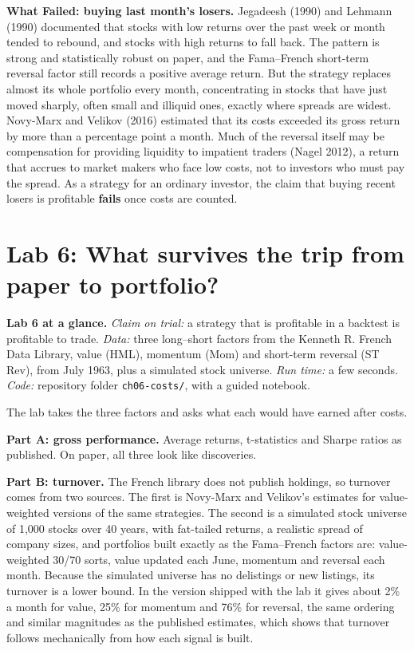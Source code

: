 \begin{callout}
\textbf{What Failed: buying last month's losers.} Jegadeesh (1990) and Lehmann (1990) documented that stocks with low returns over the past week or month tended to rebound, and stocks with high returns to fall back. The pattern is strong and statistically robust on paper, and the Fama--French short-term reversal factor still records a positive average return. But the strategy replaces almost its whole portfolio every month, concentrating in stocks that have just moved sharply, often small and illiquid ones, exactly where spreads are widest. Novy-Marx and Velikov (2016) estimated that its costs exceeded its gross return by more than a percentage point a month. Much of the reversal itself may be compensation for providing liquidity to impatient traders (Nagel 2012), a return that accrues to market makers who face low costs, not to investors who must pay the spread. As a strategy for an ordinary investor, the claim that buying recent losers is profitable \textbf{fails} once costs are counted.
\end{callout}

\section{Lab 6: What survives the trip from paper to portfolio?}
\label{sec:06-lab}

\begin{callout}
\textbf{Lab 6 at a glance.} \emph{Claim on trial:} a strategy that is profitable in a backtest is profitable to trade. \emph{Data:} three long--short factors from the Kenneth R. French Data Library, value (HML), momentum (Mom) and short-term reversal (ST Rev), from July 1963, plus a simulated stock universe. \emph{Run time:} a few seconds. \emph{Code:} repository folder \texttt{ch06-costs/}, with a guided notebook.
\end{callout}

The lab takes the three factors and asks what each would have earned after costs.

\textbf{Part A: gross performance.} Average returns, t-statistics and Sharpe ratios as published. On paper, all three look like discoveries.

\textbf{Part B: turnover.} The French library does not publish holdings, so turnover comes from two sources. The first is Novy-Marx and Velikov's estimates for value-weighted versions of the same strategies. The second is a simulated stock universe of 1,000 stocks over 40 years, with fat-tailed returns, a realistic spread of company sizes, and portfolios built exactly as the Fama--French factors are: value-weighted 30/70 sorts, value updated each June, momentum and reversal each month. Because the simulated universe has no delistings or new listings, its turnover is a lower bound. In the version shipped with the lab it gives about 2\% a month for value, 25\% for momentum and 76\% for reversal, the same ordering and similar magnitudes as the published estimates, which shows that turnover follows mechanically from how each signal is built.


